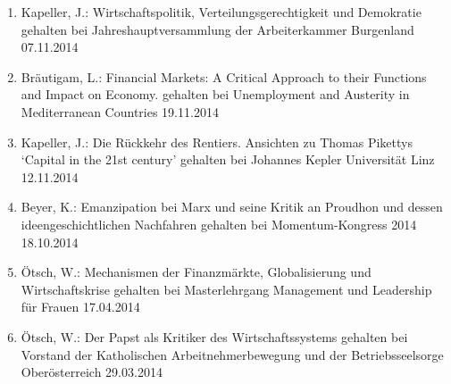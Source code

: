 \begin{enumerate}
	\item Kapeller, J.: Wirtschaftspolitik, Verteilungsgerechtigkeit und Demokratie gehalten bei Jahreshauptversammlung der Arbeiterkammer Burgenland 07.11.2014
	\item Bräutigam, L.: Financial Markets: A Critical Approach to their Functions and Impact on Economy. gehalten bei Unemployment and Austerity in Mediterranean Countries 19.11.2014
	\item Kapeller, J.: Die Rückkehr des Rentiers. Ansichten zu Thomas Pikettys ‘Capital in the 21st century’ gehalten bei Johannes Kepler Universität Linz 12.11.2014
	\item Beyer, K.: Emanzipation bei Marx und seine Kritik an Proudhon und dessen ideengeschichtlichen Nachfahren gehalten bei Momentum-Kongress 2014 18.10.2014
	\item Ötsch, W.: Mechanismen der Finanzmärkte, Globalisierung und Wirtschaftskrise gehalten bei Masterlehrgang Management und Leadership für Frauen 17.04.2014
	\item Ötsch, W.: Der Papst als Kritiker des Wirtschaftssystems gehalten bei Vorstand der Katholischen Arbeitnehmerbewegung und der Betriebsseelsorge Oberösterreich 29.03.2014
\end{enumerate}
